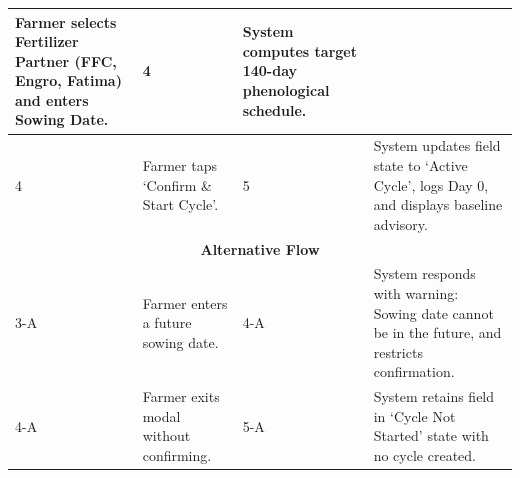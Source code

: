 \documentclass{FastFyp}
\begin{document}
\begin{table}[!ht]
\begin{tabular}{|lllll|}
  \multicolumn{2}{p{6.0cm}|}{Farmer selects Fertilizer Partner (FFC, Engro, Fatima) and enters Sowing Date.} &
  \multicolumn{1}{p{0.8cm}|}{4} &
  \multicolumn{1}{p{5.6cm}|}{System computes target 140-day phenological schedule.} \\ \hline
\multicolumn{1}{|p{0.8cm}|}{4} &
  \multicolumn{2}{p{6.0cm}|}{Farmer taps `Confirm \& Start Cycle'.} &
  \multicolumn{1}{p{0.8cm}|}{5} &
  \multicolumn{1}{p{5.6cm}|}{System updates field state to `Active Cycle', logs Day 0, and displays baseline advisory.} \\ \hline
\multicolumn{5}{|c|}{\textbf{Alternative Flow}} \\ \hline
\multicolumn{1}{|p{0.8cm}|}{3-A} &
  \multicolumn{2}{p{6.0cm}|}{Farmer enters a future sowing date.} &
  \multicolumn{1}{p{0.8cm}|}{4-A} &
  \multicolumn{1}{p{5.6cm}|}{System responds with warning: Sowing date cannot be in the future, and restricts confirmation.} \\ \hline
\multicolumn{1}{|p{0.8cm}|}{4-A} &
  \multicolumn{2}{p{6.0cm}|}{Farmer exits modal without confirming.} &
  \multicolumn{1}{p{0.8cm}|}{5-A} &
  \multicolumn{1}{p{5.6cm}|}{System retains field in `Cycle Not Started' state with no cycle created.} \\ \hline
\end{tabular}
\end{table}
\end{document}
